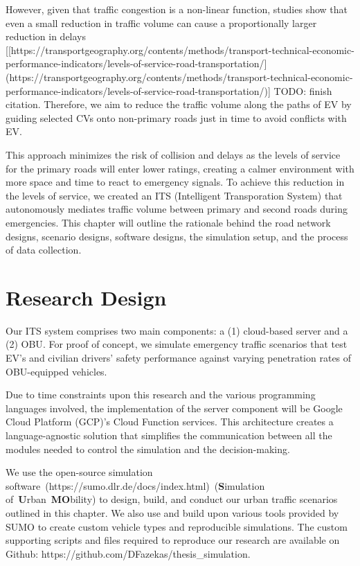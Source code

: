 However, given that traffic congestion is a non-linear function, studies show that even a small reduction in traffic volume can cause a proportionally larger reduction in delays [[https://transportgeography.org/contents/methods/transport-technical-economic-performance-indicators/levels-of-service-road-transportation/](https://transportgeography.org/contents/methods/transport-technical-economic-performance-indicators/levels-of-service-road-transportation/)] {TODO: finish citation}. Therefore, we aim to reduce the traffic volume along the paths of \acrshort{EV} by guiding selected CVs onto non-primary roads just in time to avoid conflicts with \acrshort{EV}.

This approach minimizes the risk of collision and delays as the levels of service for the primary roads will enter lower ratings, creating a calmer environment with more space and time to react to emergency signals. To achieve this reduction in the levels of service, we created an \acrshort{ITS} (Intelligent Transporation System) that autonomously mediates traffic volume between primary and second roads during emergencies. This chapter will outline the rationale behind the road network designs, scenario designs, software designs, the simulation setup, and the process of data collection.

\section{Research Design}

Our \acrshort{ITS} system comprises two main components: a (1) cloud-based server and a (2) \acrshort{OBU}. For proof of concept, we simulate emergency traffic scenarios that test \acrshort{EV}'s and civilian drivers' safety performance against varying penetration rates of \acrshort{OBU}-equipped vehicles.

Due to time constraints upon this research and the various programming languages involved, the implementation of the server component will be Google Cloud Platform (GCP)'s Cloud Function services. This architecture creates a language-agnostic solution that simplifies the communication between all the modules needed to control the simulation and the decision-making.

We use the open-source simulation software \cite{SUMO}(https://sumo.dlr.de/docs/index.html) (\textbf{S}imulation of \textbf{U}rban \textbf{MO}bility) to design, build, and conduct our urban traffic scenarios outlined in this chapter. We also use and build upon various tools provided by SUMO to create custom vehicle types and reproducible simulations. The custom supporting scripts and files required to reproduce our research are available on Github: https://github.com/DFazekas/thesis_simulation.

